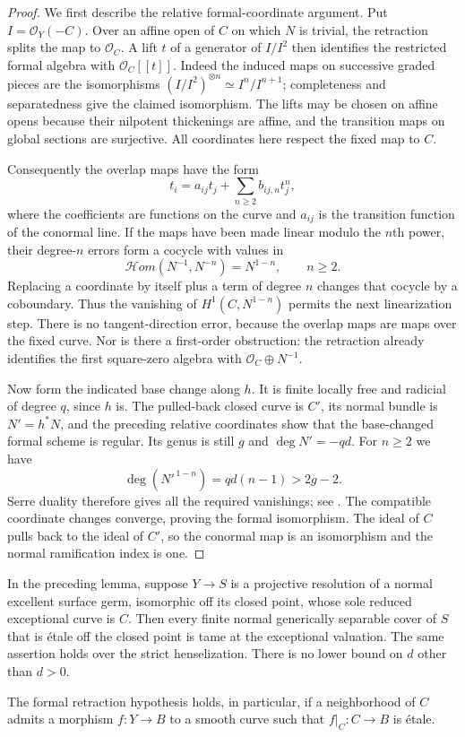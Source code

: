 \begin{proof}
We first describe the relative formal-coordinate argument.
Put $I=\mathcal O_Y(-C)$.  Over an affine open of $C$ on
which $N$ is trivial, the retraction splits the map to
$\mathcal O_C$.  A lift $t$ of a generator of $I/I^2$
then identifies the restricted formal algebra with
$\mathcal O_C[[t]]$.  Indeed the induced maps on successive
graded pieces are the isomorphisms
$(I/I^2)^{\otimes n}\simeq I^n/I^{n+1}$; completeness and
separatedness give the claimed isomorphism.  The lifts may
be chosen on affine opens because their nilpotent thickenings
are affine, and the transition maps on global sections are
surjective.  All coordinates here respect the fixed map to
$C$.

Consequently the overlap maps have the form
\[
          t_i=a_{ij}t_j+\sum_{n\geq2}b_{ij,n}t_j^n,
\]
where the coefficients are functions on the curve and
$a_{ij}$ is the transition function of the conormal line.
If the maps have been made linear modulo the $n$th power,
their degree-$n$ errors form a cocycle with values in
\[
 \mathcal Hom(N^{-1},N^{-n})=N^{1-n},\qquad n\geq2.
\]
Replacing a coordinate by itself plus a term of degree $n$
changes that cocycle by a coboundary.  Thus the vanishing
of $H^1(C,N^{1-n})$ permits the next linearization step.
There is no tangent-direction error, because the overlap
maps are maps over the fixed curve.  Nor is there a
first-order obstruction: the retraction already identifies
the first square-zero algebra with
$\mathcal O_C\oplus N^{-1}$.

Now form the indicated base change along $h$.  It is finite
locally free and radicial of degree $q$, since $h$ is.
The pulled-back closed curve is $C'$, its normal bundle is
$N'=h^*N$, and the preceding relative coordinates show that
the base-changed formal scheme is regular.  Its genus is
still $g$ and $\deg N'=-qd$.  For $n\geq2$ we have
\[
               \deg(N'^{\,1-n})=qd(n-1)>2g-2.
\]
Serre duality therefore gives all the required vanishings;
see \cite[Lemmas 53.4.1 and 53.5.2, tags 0BS2 and 0BS6]
{StacksBNegativeCurve}.  The compatible coordinate changes
converge, proving the formal isomorphism.  The ideal of
$C$ pulls back to the ideal of $C'$, so the conormal map
is an isomorphism and the normal ramification index is one.
\end{proof}

\begin{proposition}
\label{D:formal-retraction-tame}
In the preceding lemma, suppose $Y\to S$ is a projective
resolution of a normal excellent surface germ, isomorphic
off its closed point, whose sole reduced exceptional curve
is $C$.  Then every finite normal generically separable
cover of $S$ that is \'etale off the closed point is tame
at the exceptional valuation.  The same assertion holds
over the strict henselization.  There is no lower bound
on $d$ other than $d>0$.

The formal retraction hypothesis holds, in particular,
if a neighborhood of $C$ admits a morphism $f:Y\to B$
to a smooth curve such that $f|_C:C\to B$ is \'etale.
\end{proposition}

